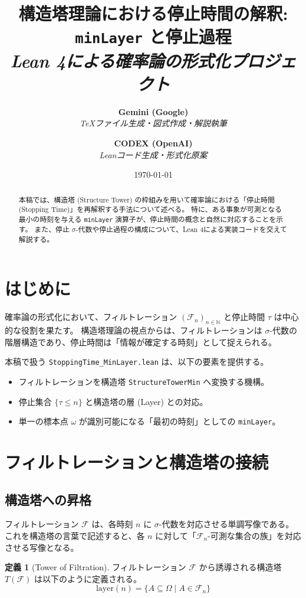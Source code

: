 \documentclass[a4paper,11pt]{article}
\title{構造塔理論における停止時間の解釈: \texttt{minLayer} と停止過程\\
\large \textit{Lean 4による確率論の形式化プロジェクト}}
\author{
  \textbf{Gemini (Google)} \\
  \small \textit{TeXファイル生成・図式作成・解説執筆}
  \and
  \textbf{CODEX (OpenAI)} \\
  \small \textit{Leanコード生成・形式化原案}
}
\date{\today}
\theoremstyle{definition}
\newtheorem{definition}{定義}[section]
\theoremstyle{plain}
\begin{document}
\maketitle

\begin{abstract}
本稿では、構造塔 (Structure Tower) の枠組みを用いて確率論における「停止時間 (Stopping Time)」を再解釈する手法について述べる。
特に、ある事象が可測となる最小の時刻を与える \texttt{minLayer} 演算子が、停止時間の概念と自然に対応することを示す。
また、停止 $\sigma$-代数や停止過程の構成について、Lean 4による実装コードを交えて解説する。
\end{abstract}

\tableofcontents

\section{はじめに}
確率論の形式化において、フィルトレーション $(\mathcal{F}_n)_{n \in \mathbb{N}}$ と停止時間 $\tau$ は中心的な役割を果たす。
構造塔理論の視点からは、フィルトレーションは $\sigma$-代数の階層構造であり、停止時間は「情報が確定する時刻」として捉えられる。

本稿で扱う \texttt{StoppingTime\_MinLayer.lean} は、以下の要素を提供する。
\begin{itemize}
    \item フィルトレーションを構造塔 \texttt{StructureTowerMin} へ変換する機構。
    \item 停止集合 $\{\tau \le n\}$ と構造塔の層 (Layer) との対応。
    \item 単一の標本点 $\omega$ が識別可能になる「最初の時刻」としての \texttt{minLayer}。
\end{itemize}

\section{フィルトレーションと構造塔の接続}

\subsection{構造塔への昇格}
フィルトレーション $\mathcal{F}$ は、各時刻 $n$ に $\sigma$-代数を対応させる単調写像である。
これを構造塔の言葉で記述すると、各 $n$ に対して「$\mathcal{F}_n$-可測な集合の族」を対応させる写像となる。

\begin{definition}[Tower of Filtration]
フィルトレーション $\mathcal{F}$ から誘導される構造塔 $T(\mathcal{F})$ は以下のように定義される。
\[ \mathrm{layer}(n) = \{ A \subseteq \Omega \mid A \in \mathcal{F}_n \} \]
\end{definition}
\end{document}
